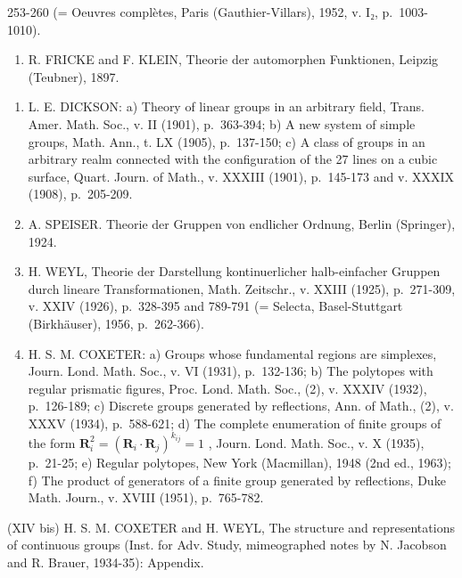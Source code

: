 253-260 (= Oeuvres complètes, Paris (Gauthier-Villars), 1952, v. I₂, p.~1003-1010).

\begin{enumerate}
\def\labelenumi{(\Alph{enumi})}
\setcounter{enumi}{23}
\tightlist
\item
  R. FRICKE and F. KLEIN, Theorie der automorphen Funktionen, Leipzig (Teubner), 1897.
\end{enumerate}

\begin{enumerate}
\def\labelenumi{(\Roman{enumi})}
\setcounter{enumi}{10}
\item
  L. E. DICKSON: a) Theory of linear groups in an arbitrary field, Trans. Amer. Math. Soc., v. II (1901), p.~363-394; b) A new system of simple groups, Math. Ann., t. LX (1905), p.~137-150; c) A class of groups in an arbitrary realm connected with the configuration of the 27 lines on a cubic surface, Quart. Journ. of Math., v. XXXIII (1901), p.~145-173 and v. XXXIX (1908), p.~205-209.
\item
  A. SPEISER. Theorie der Gruppen von endlicher Ordnung, Berlin (Springer), 1924.
\item
  H. WEYL, Theorie der Darstellung kontinuerlicher halb-einfacher Gruppen durch lineare Transformationen, Math. Zeitschr., v. XXIII (1925), p.~271-309, v. XXIV (1926), p.~328-395 and 789-791 (= Selecta, Basel-Stuttgart (Birkhäuser), 1956, p.~262-366).
\item
  H. S. M. COXETER: a) Groups whose fundamental regions are simplexes, Journ. Lond. Math. Soc., v. VI (1931), p.~132-136; b) The polytopes with regular prismatic figures, Proc. Lond. Math. Soc., (2), v. XXXIV (1932), p.~126-189; c) Discrete groups generated by reflections, Ann. of Math., (2), v. XXXV (1934), p.~588-621; d) The complete enumeration of finite groups of the form \(\mathbf{R}_i^2 = (\mathbf{R}_i\cdot \mathbf{R}_j)^{k_{ij}} = 1\) , Journ. Lond. Math. Soc., v. X (1935), p.~21-25; e) Regular polytopes, New York (Macmillan), 1948 (2nd ed., 1963); f) The product of generators of a finite group generated by reflections, Duke Math. Journ., v. XVIII (1951), p.~765-782.
\end{enumerate}

(XIV bis) H. S. M. COXETER and H. WEYL, The structure and representations of continuous groups (Inst. for Adv. Study, mimeographed notes by N. Jacobson and R. Brauer, 1934-35): Appendix.

